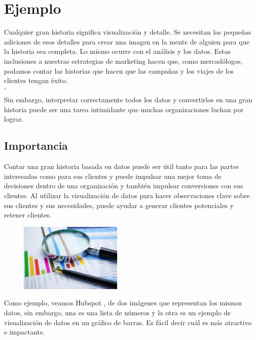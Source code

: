 \documentclass[preprint,12pt]{elsarticle}
\begin{document}
	

\section{Ejemplo}
	\label{S:1}

Cualquier gran historia significa visualización y detalle. Se necesitan las pequeñas adiciones de esos detalles para crear una imagen en la mente de alguien para que la historia sea completa. Lo mismo ocurre con el análisis y los datos. Estas inclusiones a nuestras estrategias de marketing hacen que, como mercadólogos, podamos contar las historias que hacen que las campañas y los viajes de los clientes tengan éxito. \\
'\\
Sin embargo, interpretar correctamente todos los datos y convertirlos en una gran historia puede ser una tarea intimidante que muchas organizaciones luchan por lograr.\\

\subsection{Importancia}	

Contar una gran historia basada en datos puede ser útil tanto para las partes interesadas como para sus clientes y puede impulsar una mejor toma de decisiones dentro de una organización y también impulsar conversiones con sus clientes. Al utilizar la visualización de datos para hacer observaciones clave sobre sus clientes y sus necesidades, puede ayudar a generar clientes potenciales y retener clientes.\\

			\begin{figure}[htb]
				\begin{center}
					\includegraphics[width=5cm]{./Imagenes/ejemplo}
				\end{center}
			\end{figure}

Como ejemplo, veamos Hubspot , de dos imágenes que representan los mismos datos, sin embargo, una es una lista de números y la otra es un ejemplo de visualización de datos en un gráfico de barras. Es fácil decir cuál es más atractivo e impactante.\\
\end{document}

